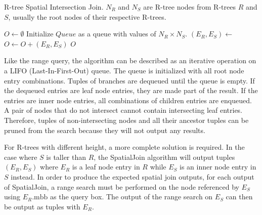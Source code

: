 \begin{algorithm}
  \caption{R-tree Spatial Intersection Join. \(N_R\) and \(N_S\) are R-tree nodes from R-trees \(R\) and \(S\), usually the root nodes of their respective R-trees.}
  \label{alg-r-tree-spatial-intersection-join}
  \begin{algorithmic}[1]
      \State \(O \leftarrow \emptyset\)
      \State Initialize \(Queue\) as a queue with values of \(N_R \times N_S\).
        \State \((E_R, E_S) \leftarrow\) 
            \State \(O \leftarrow O + (E_R, E_S)\)
          \Else
                \State {}
              \EndFor
            \EndFor
          \EndIf
        \EndIf
      \EndWhile
      \State \Return \(O\)
    \EndFunction
  \end{algorithmic}
\end{algorithm}

Like the range query, the algorithm can be described as an iterative operation on a LIFO (Last-In-First-Out) queue. The queue is initialized with all root node entry combinations. Tuples of branches are dequeued until the queue is empty. If the dequeued entries are leaf node entries, they are made part of the result. If the entries are inner node entries, all combinations of children entries are enqueued. A pair of nodes that do not intersect cannot contain intersecting leaf entries. Therefore, tuples of non-intersecting nodes and all their ancestor tuples can be pruned from the search because they will not output any results.

For R-trees with different height, a more complete solution is required. In the case where \(S\) is taller than \(R\), the SpatialJoin algorithm will output tuples \((E_R, E_S)\) where \(E_R\) is a leaf node entry in \(R\) while \(E_S\) is an inner node entry in \(S\) instead. In order to produce the expected spatial join outputs, for each output of SpatialJoin, a range search must be performed on the node referenced by \(E_S\) using \(E_R\mathrm{.mbb}\) as the query box. The output of the range search on \(E_S\) can then be output as tuples with \(E_R\).

